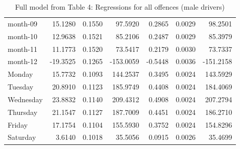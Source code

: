 \documentclass[10pt]{article}
\begin{document}
\begin{table}[ht]
\begin{tabular}{lrrrrrr}
  month-09 & 15.1280 & 0.1550 & 97.5920 & 0.2865 & 0.0029 & 98.2501 \\ 
  month-10 & 12.9638 & 0.1521 & 85.2106 & 0.2487 & 0.0029 & 85.3979 \\ 
  month-11 & 11.1773 & 0.1520 & 73.5417 & 0.2179 & 0.0030 & 73.7337 \\ 
  month-12 & -19.3525 & 0.1265 & -153.0059 & -0.5448 & 0.0036 & -151.2158 \\ 
  Monday & 15.7732 & 0.1093 & 144.2537 & 0.3495 & 0.0024 & 143.5929 \\ 
  Tuesday & 20.8910 & 0.1123 & 185.9749 & 0.4408 & 0.0024 & 184.4069 \\ 
  Wednesday & 23.8832 & 0.1140 & 209.4312 & 0.4908 & 0.0024 & 207.2794 \\ 
  Thursday & 21.1547 & 0.1127 & 187.7009 & 0.4451 & 0.0024 & 186.2710 \\ 
  Friday & 17.1754 & 0.1104 & 155.5930 & 0.3752 & 0.0024 & 154.8296 \\ 
  Saturday & 3.6140 & 0.1018 & 35.5056 & 0.0915 & 0.0026 & 35.4699 \\ 
   \hline
\end{tabular}
\caption{Full model from Table 4: Regressions for all offences (male drivers)} 
\label{tab_4_all_pts_no_age_M}
\end{table}


\clearpage
\pagebreak



\end{document}
